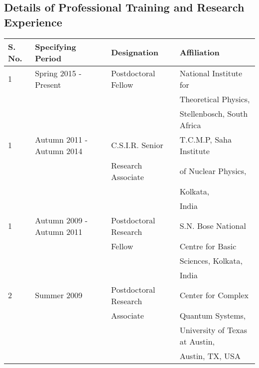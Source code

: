 \documentclass[a4paper,11pt,color]{article}
\begin{document}
\subsection{Details of Professional Training and Research Experience}
\begin{tabular}{|l|l|l|l|}
\hline
S. No. & Specifying Period                  & Designation                             & Affiliation\\
\hline
1      & Spring 2015 - Present              & Postdoctoral Fellow		      & National Institute for\\ 		&				    &					      & Theoretical Physics, \\
	&				    &					      & Stellenbosch, South Africa\\ 	
\hline
1      & Autumn 2011 - Autumn 2014          & C.S.I.R. Senior 	                      & T.C.M.P, Saha Institute\\
       &                                    & Research Associate                                  & of Nuclear Physics,  \\
       &                                    &                                         &  Kolkata,\\         
       &                                    &                                         & India \\
\hline
1      & Autumn 2009 - Autumn 2011          & Postdoctoral Research                   & S.N. Bose National\\
       &                                    & Fellow                                  & Centre for Basic  \\
       &                                    &                                         & Sciences, Kolkata,\\         
       &                                    &                                         & India \\
\hline
2      & Summer 2009                        & Postdoctoral Research                   &Center for Complex\\
       &                                    & Associate                               &Quantum Systems, \\
       &                                    &                                         &University of Texas at Austin,\\
       &                                    &                                         &Austin, TX, USA\\
\hline

\end{tabular}
\end{document}
